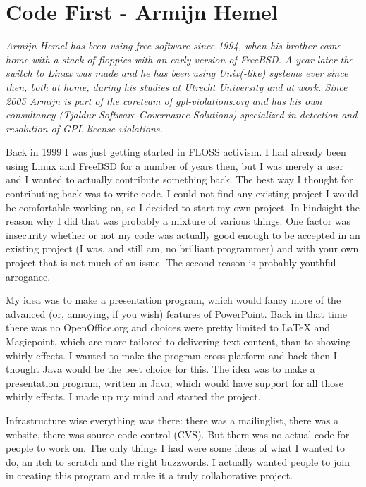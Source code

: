 \chapter{Code First - Armijn Hemel}

\textit{Armijn Hemel has been using free software since 1994, when his brother came home with a stack of floppies with an early version of FreeBSD. A year later the switch to Linux was made and he has been using Unix(-like) systems ever since then, both at home, during his studies at Utrecht University and at work.
Since 2005 Armijn is part of the coreteam of gpl-violations.org and has his own consultancy (Tjaldur Software Governance Solutions) specialized in detection and resolution of GPL license violations.}

Back in 1999 I was just getting started in FLOSS activism. I had already been using Linux and FreeBSD for a number of years then, but I was merely a user and I wanted to actually contribute something back. The best way I thought for contributing back was to write code. I could not find any existing project I would be comfortable working on, so I decided to start my own project. In hindsight the reason why I did that was probably a mixture of various things. One factor was insecurity whether or not my code was actually good enough to be accepted in an existing project (I was, and still am, no brilliant programmer) and with your own project that is not much of an issue. The second reason is probably youthful arrogance.

My idea was to make a presentation program, which would fancy more of the advanced (or, annoying, if you wish) features of PowerPoint. Back in that time there was no OpenOffice.org and choices were pretty limited to LaTeX and Magicpoint, which are more tailored to delivering text content, than to showing whirly effects. I wanted to make the program cross platform and back then I thought Java would be the best choice for this. The idea was to make a presentation program, written in Java, which would have support for all those whirly effects. I made up my mind and started the project.

Infrastructure wise everything was there: there was a mailinglist, there was a website, there was source code control (CVS). But there was no actual code for people to work on. The only things I had were some ideas of what I wanted to do, an itch to scratch and the right buzzwords. I actually wanted people to join in creating this program and make it a truly collaborative project.

